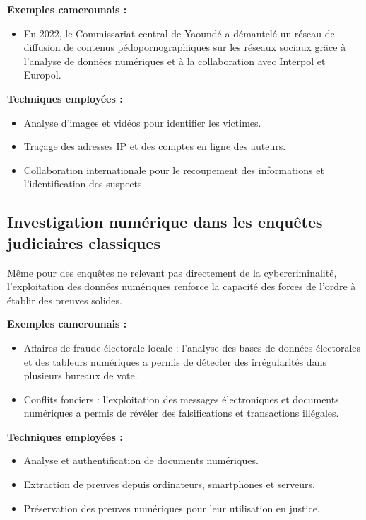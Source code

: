 \documentclass[12pt,a4paper]{article}
\begin{document}
\textbf{Exemples camerounais :}
\begin{itemize}[leftmargin=*]
    \item En 2022, le Commissariat central de Yaoundé a démantelé un réseau de diffusion de contenus pédopornographiques sur les réseaux sociaux grâce à l'analyse de données numériques et à la collaboration avec Interpol et Europol.
\end{itemize}

\textbf{Techniques employées :}
\begin{itemize}[leftmargin=*]
    \item Analyse d'images et vidéos pour identifier les victimes.
    \item Traçage des adresses IP et des comptes en ligne des auteurs.
    \item Collaboration internationale pour le recoupement des informations et l'identification des suspects.
\end{itemize}

\subsection{Investigation numérique dans les enquêtes judiciaires classiques}

Même pour des enquêtes ne relevant pas directement de la cybercriminalité, l'exploitation des données numériques renforce la capacité des forces de l'ordre à établir des preuves solides.

\textbf{Exemples camerounais :}
\begin{itemize}[leftmargin=*]
    \item Affaires de fraude électorale locale : l'analyse des bases de données électorales et des tableurs numériques a permis de détecter des irrégularités dans plusieurs bureaux de vote.
    \item Conflits fonciers : l'exploitation des messages électroniques et documents numériques a permis de révéler des falsifications et transactions illégales.
\end{itemize}

\textbf{Techniques employées :}
\begin{itemize}[leftmargin=*]
    \item Analyse et authentification de documents numériques.
    \item Extraction de preuves depuis ordinateurs, smartphones et serveurs.
    \item Préservation des preuves numériques pour leur utilisation en justice.
\end{itemize}
\end{document}
